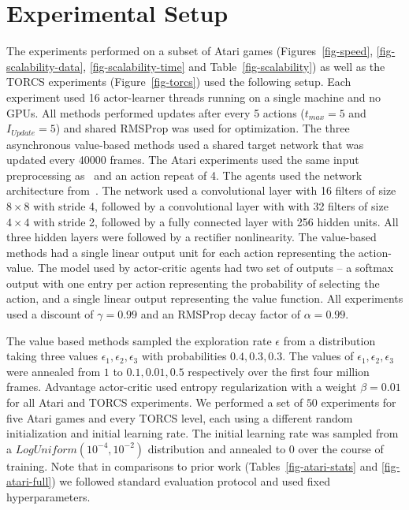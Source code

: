 \documentclass{article} %
\begin{document}
\section{Experimental Setup}
\label{sec:experimental-setup}
The experiments performed on a subset of Atari games (Figures~\ref{fig-speed}, \ref{fig-scalability-data}, \ref{fig-scalability-time} and Table~\ref{fig-scalability}) as well as the TORCS experiments (Figure~\ref{fig-torcs}) used the following setup.  Each experiment used 16 actor-learner threads running on a single machine and no GPUs.
All methods performed updates after every 5 actions ($t_{max}=5$ and $I_{Update}=5$) and shared RMSProp was used for optimization.
The three asynchronous value-based methods used a shared target network that was updated every 40000 frames.
The Atari experiments used the same input preprocessing as~\cite{mnih-dqn-2015} and an action repeat of 4.
The agents used the network architecture from~\cite{mnih-atari-2013}.
The network used a convolutional layer with 16 filters of size $8\times 8$ with stride 4, followed by a convolutional layer with with 32 filters of size $4\times 4$ with stride 2, followed by a fully connected layer with 256 hidden units.
All three hidden layers were followed by a rectifier nonlinearity.
The value-based methods had a single linear output unit for each action representing the action-value.
The model used by actor-critic agents had two set of outputs -- a softmax output with one entry per action representing the probability of selecting the action, and a single linear output representing the value function.
All experiments used a discount of $\gamma=0.99$ and an RMSProp decay factor of $\alpha=0.99$.

The value based methods sampled the exploration rate $\epsilon$ from a distribution taking three values $\epsilon_1, \epsilon_2, \epsilon_3$ with probabilities $0.4, 0.3, 0.3$.
The values of $\epsilon_1, \epsilon_2, \epsilon_3$ were annealed from $1$ to $0.1, 0.01, 0.5$ respectively over the first four million frames.
Advantage actor-critic used entropy regularization with a weight $\beta=0.01$ for all Atari and TORCS experiments.
We performed a set of $50$ experiments for five Atari games and every TORCS level, each using a different random initialization and initial learning rate.
The initial learning rate was sampled from a $LogUniform(10^{-4}, 10^{-2})$ distribution and annealed to $0$ over the course of training.
%
Note that in comparisons to prior work (Tables~\ref{fig-atari-stats} and \ref{fig-atari-full}) we followed standard evaluation protocol and used fixed hyperparameters.
\end{document}
